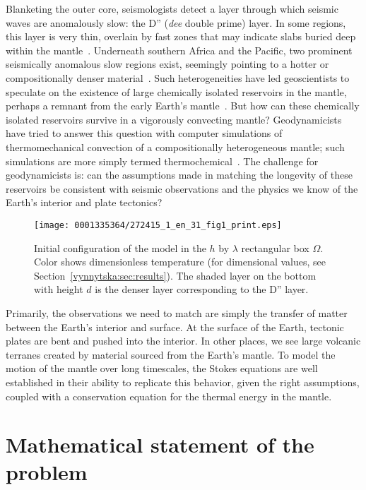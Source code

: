 Blanketing the outer core, seismologists detect a layer through which
seismic waves are anomalously slow: the D'' (\emph{dee} double prime) layer.
In some regions, this layer is very thin, overlain by fast zones that may
indicate slabs buried deep within the mantle~\citep{McNamaraZhong2005}.
Underneath southern Africa and the Pacific, two prominent seismically
anomalous slow regions exist, seemingly pointing to a hotter or
compositionally denser material~\citep{McNutt1998}. Such heterogeneities
have led geoscientists to speculate on the existence of large chemically
isolated reservoirs in the mantle, perhaps a remnant from the early
Earth's mantle~\citep{Burke2008}.  But how can these chemically
isolated reservoirs survive in a vigorously convecting mantle?
Geodynamicists have tried to answer this question with computer
simulations of thermomechanical convection of a compositionally
heterogeneous mantle; such simulations are more simply termed
thermochemical~\hbox{\citep{McNamara2010}}. The challenge for geodynamicists is:
can the assumptions made in matching the longevity of these reservoirs
be consistent with seismic observations and the physics we know of the
Earth's interior and plate tectonics?

\begin{figure}[!t]
\centering
\texttt{[image: 0001335364/272415\_1\_en\_31\_fig1\_print.eps]}
\caption{Initial configuration of the model in the $h$ by
    $\lambda$ rectangular box $\Omega$. Color shows dimensionless
    temperature (for dimensional values, see Section~\ref{vynnytska:sec:results}). The shaded layer on the bottom with height $d$ is the denser layer corresponding to the
    D'' layer.}\label{vynnytska:fig:IC}\vspace*{5pt}
\end{figure}

Primarily, the observations we need to match are simply the transfer of
matter between the Earth's interior and surface. At the surface of the
Earth, tectonic plates are bent and pushed into the interior. In other
places, we see large volcanic terranes created by material sourced
from the Earth's mantle. To model the motion of the mantle over long
timescales, the Stokes equations are well established in their ability
to replicate this behavior, given the right assumptions, coupled with
a conservation equation for the thermal energy in the mantle.


\section{Mathematical statement of the problem}
\label{vynnytska:sec:maths}

